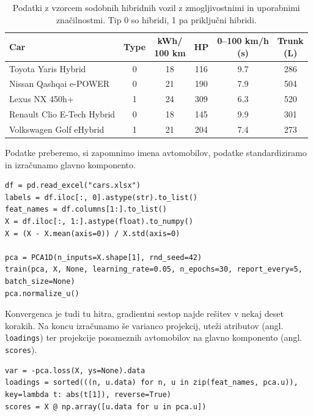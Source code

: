 \begin{table}[ht]
\centering
\small
\begin{tabular}{lccccc}
\toprule
\textbf{Car} & \textbf{Type} & \makecell{\textbf{kWh/}\\\textbf{100 km}} & \textbf{HP} & \makecell{\textbf{0--100 km/h}\\\textbf{(s)}} & \makecell{\textbf{Trunk}\\\textbf{(L)}} \\
\midrule
Toyota Yaris Hybrid        & 0  & 18 & 116 & 9.7 & 286 \\
Nissan Qashqai e-POWER     & 0  & 21 & 190 & 7.9 & 504 \\
Lexus NX 450h+             & 1  & 24 & 309 & 6.3 & 520 \\
Renault Clio E-Tech Hybrid & 0  & 18 & 145 & 9.9 & 301 \\
Volkswagen Golf eHybrid    & 1  & 21 & 204 & 7.4 & 273 \\
\bottomrule
\end{tabular}
\caption{Podatki z vzorcem sodobnih hibridnih vozil z zmogljivostnimi in uporabnimi značilnostmi. Tip 0 so hibridi, 1 pa priključni hibridi.}
\label{t:cars}
\end{table}

Podatke preberemo, si zapomnimo imena avtomobilov, podatke standardiziramo in izračunamo glavno komponento.

\vspace*{3mm}
\begin{lstlisting}
df = pd.read_excel("cars.xlsx")
labels = df.iloc[:, 0].astype(str).to_list()
feat_names = df.columns[1:].to_list()
X = df.iloc[:, 1:].astype(float).to_numpy()
X = (X - X.mean(axis=0)) / X.std(axis=0)

pca = PCA1D(n_inputs=X.shape[1], rnd_seed=42)
train(pca, X, None, learning_rate=0.05, n_epochs=30, report_every=5, batch_size=None)
pca.normalize_u()
\end{lstlisting}

Konvergenca je tudi tu hitra, gradientni sestop najde rešitev v nekaj deset korakih. Na koncu izračunamo še varianco projekcij, uteži atributov (angl. \texttt{loadings}) ter projekcije posameznih avtomobilov na glavno komponento (angl. \texttt{scores}).

\vspace*{3mm}
\begin{lstlisting}
var = -pca.loss(X, ys=None).data
loadings = sorted(((n, u.data) for n, u in zip(feat_names, pca.u)), key=lambda t: abs(t[1]), reverse=True)
scores = X @ np.array([u.data for u in pca.u])
\end{lstlisting}


